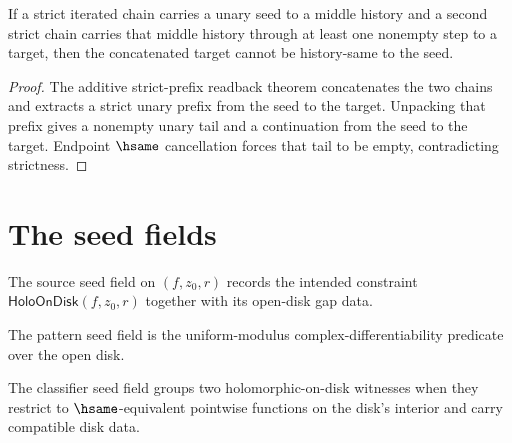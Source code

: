 \begin{theorem}
\label{thm:iterated-strict-cplxdiff-add-closed-endpoint-hsame-absurd}
If a strict iterated chain carries a unary seed to a middle history and a
second strict chain carries that middle history through at least one nonempty
step to a target, then the concatenated target cannot be history-same to the
seed.
\end{theorem}
\begin{proof}
The additive strict-prefix readback theorem concatenates the two chains and
extracts a strict unary prefix from the seed to the target. Unpacking that
prefix gives a nonempty unary tail and a continuation from the seed to the
target. Endpoint $\hsame$ cancellation forces that tail to be empty,
contradicting strictness.
\end{proof}

\section{The seed fields}

\begin{definition}
\label{def:holo-source-spec}
The source seed field on $(f, z_0, r)$ records the intended constraint $\mathsf{HoloOnDisk}(f, z_0, r)$ together with its open-disk gap data.
\end{definition}

\begin{definition}
\label{def:holo-pattern-spec}
The pattern seed field is the uniform-modulus complex-differentiability predicate over the open disk.
\end{definition}

\begin{definition}
\label{def:holo-classifier-spec}
The classifier seed field groups two holomorphic-on-disk witnesses when they restrict to $\hsame$-equivalent pointwise functions on the disk's interior and carry compatible disk data.
\end{definition}

